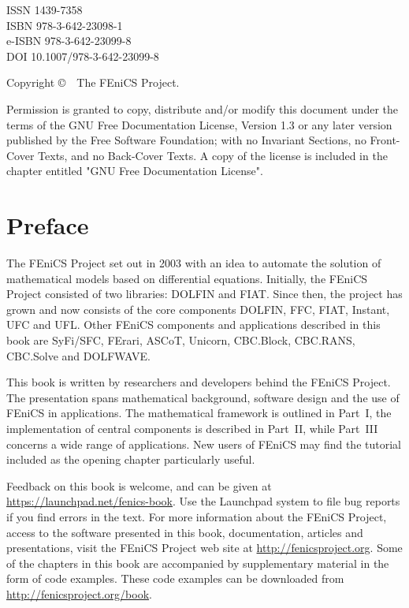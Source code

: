 \vfill

\noindent
ISSN 1439-7358 \\
ISBN 978-3-642-23098-1 \\
e-ISBN 978-3-642-23099-8 \\
DOI 10.1007/978-3-642-23099-8

\vspace{2ex}

\noindent
{\footnotesize Copyright \copyright\ \the\year\ The FEniCS Project.}

\vspace{2ex}

\noindent
{\footnotesize
Permission is granted to copy, distribute and/or modify this document
under the terms of the GNU Free Documentation License, Version 1.3 or
any later version published by the Free Software Foundation; with no
Invariant Sections, no Front-Cover Texts, and no Back-Cover Texts.  A
copy of the license is included in the chapter entitled "GNU Free
Documentation License".}

\tableofcontents

\chapter*{Preface}

\thispagestyle{empty}

The FEniCS Project set out in 2003 with an idea to automate the
solution of mathematical models based on differential equations.
Initially, the FEniCS Project consisted of two libraries: DOLFIN and
FIAT. Since then, the project has grown and now consists of the core
components DOLFIN, FFC, FIAT, Instant, UFC and UFL. Other FEniCS
components and applications described in this book are SyFi/SFC,
FErari, ASCoT, Unicorn, CBC.Block, CBC.RANS, CBC.Solve and DOLFWAVE.

This book is written by researchers and developers behind the FEniCS
Project. The presentation spans mathematical background, software
design and the use of FEniCS in applications. The mathematical
framework is outlined in Part~I, the implementation of central
components is described in Part~II, while Part~III concerns a wide
range of applications. New users of FEniCS may find the tutorial
included as the opening chapter particularly useful.

Feedback on this book is welcome, and can be given at
\url{https://launchpad.net/fenics-book}. Use the Launchpad system to
file bug reports if you find errors in the text. For more information
about the FEniCS Project, access to the software presented in this
book, documentation, articles and presentations, visit the FEniCS
Project web site at \url{http://fenicsproject.org}. Some of the
chapters in this book are accompanied by supplementary material in the
form of code examples. These code examples can be downloaded from
\url{http://fenicsproject.org/book}.

